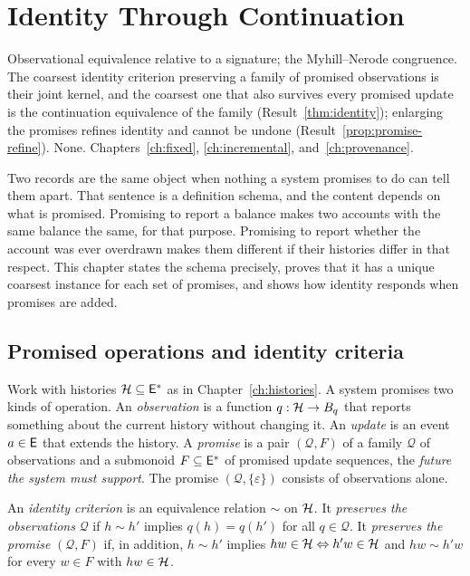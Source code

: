 \chapter{Identity Through Continuation}\label{ch:identity}
{Observational equivalence relative to a signature; the Myhill--Nerode congruence.}
{The coarsest identity criterion preserving a family of promised observations is their joint kernel, and the coarsest one that also survives every promised update is the continuation equivalence of the family (Result~\ref{thm:identity}); enlarging the promises refines identity and cannot be undone (Result~\ref{prop:promise-refine}).}
{None.}
{Chapters~\ref{ch:fixed}, \ref{ch:incremental}, and~\ref{ch:provenance}.}

Two records are the same object when nothing a system promises to do can tell them apart. That sentence is a definition schema, and the content depends on what is promised. Promising to report a balance makes two accounts with the same balance the same, for that purpose. Promising to report whether the account was ever overdrawn makes them different if their histories differ in that respect. This chapter states the schema precisely, proves that it has a unique coarsest instance for each set of promises, and shows how identity responds when promises are added.

\section{Promised operations and identity criteria}

Work with histories $\mathcal{H}\subseteq\mathsf{E}^{*}$ as in Chapter~\ref{ch:histories}. A system promises two kinds of operation. An \emph{observation} is a function $q:\mathcal{H}\to B_q$ that reports something about the current history without changing it. An \emph{update} is an event $a\in\mathsf{E}$ that extends the history. A \emph{promise} is a pair $(\mathcal Q,F)$ of a family $\mathcal Q$ of observations and a submonoid $F\subseteq\mathsf{E}^{*}$ of promised update sequences, the \emph{future the system must support}. The promise $(\mathcal Q,\{\varepsilon\})$ consists of observations alone.

\begin{definition}\label{def:identity}
An \emph{identity criterion} is an equivalence relation $\sim$ on $\mathcal{H}$. It \emph{preserves the observations} $\mathcal Q$ if $h\sim h'$ implies $q(h)=q(h')$ for all $q\in\mathcal Q$. It \emph{preserves the promise} $(\mathcal Q,F)$ if, in addition, $h\sim h'$ implies $hw\in\mathcal{H}\Leftrightarrow h'w\in\mathcal{H}$ and $hw\sim h'w$ for every $w\in F$ with $hw\in\mathcal{H}$.
\end{definition}

